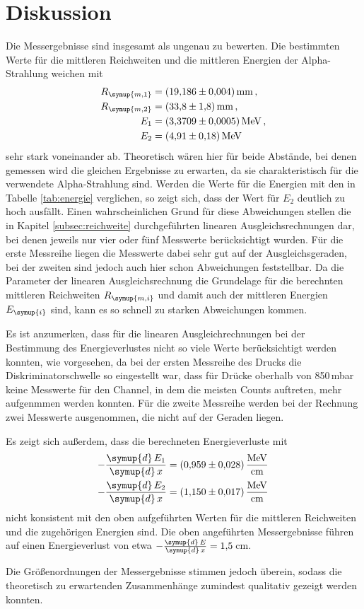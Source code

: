 \section{Diskussion}
\label{sec:Diskussion}

Die Messergebnisse sind insgesamt als ungenau zu bewerten. Die bestimmten Werte
für die mittleren Reichweiten und die mittleren Energien der Alpha-Strahlung
weichen mit
\begin{align*}
  R_{\symup{m,1}}&=\SI{19.186(0004)}{\milli\meter} \,, \\
  R_{\symup{m,2}}&=\SI{33.8(18)}{\milli\meter} \,, \\
  E_1&=\SI{3.3709(00005)}{\MeV} \,,\\
  E_2&=\SI{4.91(018)}{\MeV}
\end{align*}
sehr stark voneinander ab. Theoretisch wären hier für beide Abstände, bei denen gemessen
wird die gleichen Ergebnisse zu erwarten, da sie charakteristisch für die verwendete
Alpha-Strahlung sind. Werden die Werte für die Energien mit den in Tabelle
\ref{tab:energie} verglichen, so zeigt sich, dass der Wert für $E_2$ deutlich zu
hoch ausfällt. Einen wahrscheinlichen Grund für diese Abweichungen stellen die in
Kapitel \ref{subsec:reichweite} durchgeführten linearen Ausgleichsrechnungen dar,
bei denen jeweils nur vier oder fünf Messwerte berücksichtigt wurden. Für die erste
Messreihe liegen die Messwerte dabei sehr gut auf der Ausgleichsgeraden, bei der
zweiten sind jedoch auch hier schon Abweichungen feststellbar. Da die Parameter
der linearen Ausgleichsrechnung die Grundelage für die berechnten mittleren Reichweiten
$R_{\symup{m,i}}$ und damit auch der mittleren Energien $E_{\symup{i}}$ sind, kann
es so schnell zu starken Abweichungen kommen.

Es ist anzumerken, dass für die linearen Ausgleichrechnungen bei der Bestimmung des
Energieverlustes nicht so viele Werte berücksichtigt werden konnten, wie vorgesehen,
da bei der ersten Messreihe des Drucks die Diskriminatorschwelle so eingestellt war, dass
für Drücke oberhalb von 850\,mbar keine Messwerte für den Channel, in dem die
meisten Counts auftreten, mehr aufgenmmen werden konnten. Für die zweite Messreihe
werden bei der Rechnung zwei Messwerte ausgenommen, die nicht auf der Geraden liegen.

Es zeigt sich außerdem, dass die berechneten Energieverluste mit
\begin{align*}
  -\frac{\symup{d}\,E_1}{\symup{d}\,x}&=\SI{0.959(028)}{\MeV\per\centi\meter} \,\\
  -\frac{\symup{d}\,E_2}{\symup{d}\,x}&=\SI{1.150(017)}{\MeV\per\centi\meter}
\end{align*}
nicht konsistent mit den oben aufgeführten Werten für die mittleren Reichweiten und
die zugehörigen Energien sind. Die oben angeführten Messergebnisse führen auf einen
Energieverlust von etwa $-\frac{\symup{d}\,E}{\symup{d}\,x}=1{,}5\,$cm.

Die Größenordnungen der Messergebnisse stimmen jedoch überein, sodass die theoretisch
zu erwartenden Zusammenhänge zumindest qualitativ gezeigt werden konnten.
